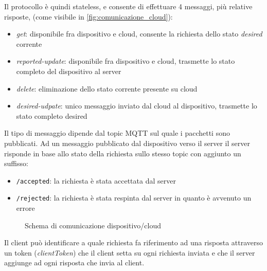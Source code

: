 \documentclass[12pt,a4paper,twoside,titlepage]{book}
\begin{document}
Il protocollo è quindi stateless, e consente di effettuare 4 messaggi, più relative risposte,
(come visibile in \autoref{fig:comunicazione_cloud}):

\begin{itemize}
    \item \textit{get}: disponibile fra dispositivo e cloud, consente la richiesta dello stato \textit{desired} corrente
    \item \textit{reported-update}: disponibile fra dispositivo e cloud, trasmette lo stato
        completo del dispositivo al server
    \item \textit{delete}: eliminazione dello stato corrente presente su cloud
    \item \textit{desired-udpate}: unico messaggio inviato dal cloud al dispositivo,
        trasmette lo stato completo desired
\end{itemize}

Il tipo di messaggio dipende dal topic MQTT sul quale i pacchetti sono pubblicati. Ad
un messaggio pubblicato dal dispositivo verso il server il server risponde in base allo
stato della richiesta sullo stesso topic con aggiunto un suffisso:
\begin{itemize}
    \item \texttt{/accepted}: la richiesta è stata accettata dal server
    \item \texttt{/rejected}: la richiesta è stata respinta dal server in quanto è
        avvenuto un errore
\end{itemize}

\begin{figure}[ht]
    \centering
    \caption{Schema di comunicazione dispositivo/cloud}
    \label{fig:comunicazione_cloud}
\end{figure}

Il client può identificare a quale richiesta fa riferimento ad una risposta attraverso un
token (\textit{clientToken}) che il client setta su ogni richiesta inviata e che il server aggiunge
ad ogni risposta che invia al client.
\end{document}
